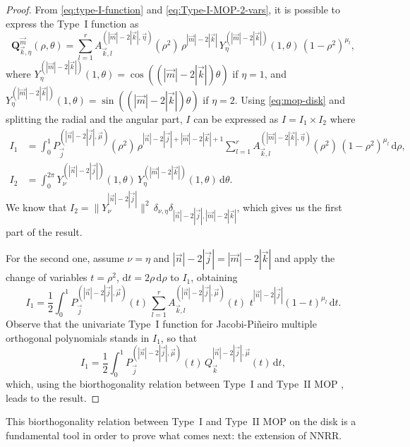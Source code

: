 \documentclass[a4paper]{article}
\theoremstyle{plain}
\theoremstyle{definition}
\newcommand{\dr}{\mathrm{d}}
\begin{document}
    \begin{proof}
    From \eqref{eq:type-I-function} and \eqref{eq:Type-I-MOP-2-vars}, it is possible to express the Type~I function as
    $$
    \mathbf Q_{\vec k,\eta}^{\vec m}(\rho,\theta) = \sum_{l=1}^r  A^{(|\vec m|-2|\vec k|, \vec \eta)}_{\vec k,l}(\rho^2)\, \rho^{|\vec m|-2|\vec k|}\, Y_\eta^{(|\vec m|-2|\vec k|)}(1,\theta)\,(1-\rho^2)^{\mu_l},
    $$
    where $Y_\eta^{(|\vec m|-2|\vec k|)}(1,\theta)=\cos((|\vec m|-2|\vec k|)\theta)$ if $\eta=1$, and $Y_\eta^{(|\vec m|-2|\vec k|)}(1,\theta)=\sin((|\vec m|-2|\vec k|)\theta)$ if $\eta=2$. Using \eqref{eq:mop-disk} and splitting the radial and the angular part, $I$ can be expressed as $I=I_1 \times I_2$ where
    \begin{equation}
        \begin{aligned}
            I_1 &= \int_0^1 P^{(|\vec n|-2|\vec j|, \vec \mu)}_{\vec j}(\rho^2)\, \rho^{|\vec n|-2|\vec j|+|\vec m|-2|\vec k|+1} \sum_{l=1}^r  A^{(|\vec m|-2|\vec k|, \vec \eta)}_{\vec k,l}(\rho^2)\,(1-\rho^2)^{\mu_l}\,\dr\rho,\\
            I_2 &= \int_0^{2\pi}  Y_\nu^{(|\vec n|-2|\vec j|)}(1,\theta)\, Y_\eta^{(|\vec m|-2|\vec k|)}(1,\theta)\, \dr\theta.
        \end{aligned}
    \end{equation}
    We know that $I_2=\|Y_{\nu}^{|\vec n|-2|\vec j|}\|^2\, \delta_{\nu,\eta}\delta_{|\vec n|-2|\vec j|,|\vec m|-2|\vec k|}$, which gives us the first part of the result. 

    For the second one, assume $\nu=\eta$ and $|\vec n|-2|\vec j| = |\vec m|-2|\vec k|$ and apply the change of variables $t=\rho^2$, $\dr t = 2\rho \,\dr \rho$ to $I_1$, obtaining
    $$
    I_1 = \frac 1 2\int_0^1 P^{(|\vec n|-2|\vec j|, \vec \mu)}_{\vec j}(t)\,  \sum_{l=1}^r  A^{(|\vec n|-2|\vec j|, \vec \mu)}_{\vec k,l}(t)\, \,t^{|\vec n|-2|\vec j|}(1-t)^{\mu_l}\,\dr t.
    $$
    Observe that the univariate Type~I function for Jacobi-Pi\~neiro multiple orthogonal polynomials stands in $I_1$, so that
    $$
    I_1 = \frac 1 2\int_0^1 P^{(|\vec n|-2|\vec j|, \vec \mu)}_{\vec j}(t)\,  Q_{\vec k}^{|\vec n|-2|\vec j|,\vec \mu}(t)\,\dr t,
    $$
    which, using the biorthogonality relation between Type~I and Type~II MOP \cite[Theorem 23.1.6]{Ism05}, leads to the result.
    
    \end{proof}

    This biorthogonality relation between Type~I and Type~II MOP on the disk is a fundamental tool in order to prove what comes next: the extension of NNRR.
\end{document}
